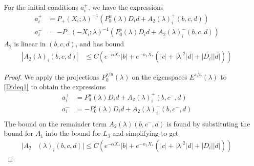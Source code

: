 \documentclass[thesis.tex]{subfiles}
\begin{document}
\begin{lemma}\label{lemma:aipm}
For the initial conditions $a_i^\pm$, we have the expressions
\begin{equation}\label{aipmexp1}
\begin{aligned}
a_i^+ &= P_+(X_i; \lambda)^{-1} \left( P_0^u(\lambda) D_i d + A_2(\lambda)_i^+(b, c, d) \right) \\
a_i^- &= -P_-(-X_i; \lambda)^{-1} \left( P_0^s(\lambda) D_i d + A_2(\lambda)_i^-(b, c, d) \right)
\end{aligned}
\end{equation}
$A_2$ is linear in $(b, c, d)$, and has bound
\begin{align}
|A_2(\lambda)_i(b, c, d)|
&\leq C \left(e^{-\alpha X_*}|b| + e^{-\alpha_1 X_*}(|c| + |\lambda|^2|d| + |D_i||d|) \right) \label{A2bound}
\end{align}

\begin{proof}
We apply the projections $P_0^{s/u}(\lambda)$ on the eigenspaces $E^{s/u}(\lambda)$ to \eqref{Dideq1} to obtain the expressions
\begin{align*}
a_i^+ &= P_0^u(\lambda) D_i d + A_2(\lambda)_i^+(b, c^-, d) \\
a_i^- &= -P_0^s(\lambda) D_i d + A_2(\lambda)_i^-(b, c^-, d) \\
\end{align*}
The bound on the remainder term $A_2(\lambda)(b, c^-, d)$ is found by substituting the bound for $A_1$ into the bound for $L_3$ and simplifying to get
\begin{align*}
|A_2&(\lambda)_i(b, c, d)| \leq C \left(e^{-\alpha X_*}|b| + e^{-\alpha_1 X_*}(|c| + |\lambda|^2|d| + |D_i||d|) \right)
\end{align*} 


\end{proof}
\end{lemma}
\end{document}
